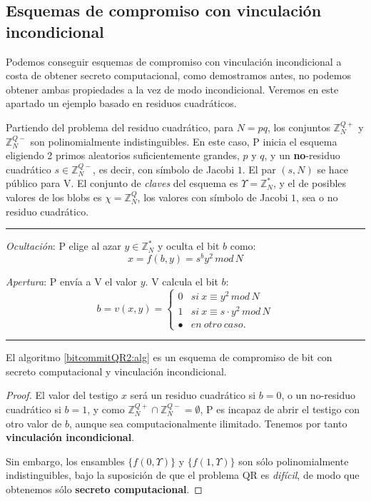 \subsection{Esquemas de compromiso con vinculación incondicional}

Podemos conseguir esquemas de compromiso con vinculación incondicional a costa de obtener secreto computacional, como demostramos antes, no podemos obtener ambas propiedades a la vez de modo incondicional. Veremos en este apartado un ejemplo basado en residuos cuadráticos.

\hfil

Partiendo del problema del residuo cuadrático, para $N=pq$, los conjuntos $\mathbb{Z}_N^{Q+}$ y $\mathbb{Z}_N^{Q-}$ son polinomialmente indistinguibles. En este caso, P inicia el esquema 
eligiendo 2 primos aleatorios suficientemente grandes, $p$ y $q$, y un \textbf{no}-residuo cuadrático $s\in \mathbb{Z}_N^{Q-}$, es decir, con símbolo de Jacobi $1$. El par $(s,N)$ se hace público para V. El conjunto de \textit{claves} del esquema es $\Upsilon = \mathbb{Z}_N^*$, y el de posibles valores de los blobs es $\chi = \mathbb{Z}_N^Q$, los valores con símbolo de Jacobi $1$, sea o no residuo cuadrático.



\hfil

\rule{\textwidth}{1pt}
\begin{algorithm}\label{commitQRbind:alg}
	\hfil
	
	\textit{Ocultación}: P elige al azar $y\in \mathbb{Z}_N^*$ y oculta el bit $b$ como:
	\[x = f(b,y) = s^b y^2 \, mod \, N \]
	
	\textit{Apertura}: P envía a V el valor $y$. V calcula el bit $b$:
	\[ b = v(x,y) = 
	\begin{cases}
	0  & si\ x\equiv y^2 \, mod \, N  \\
	1 & si\ x\equiv s\cdot y^2 \, mod \, N \\
	\bullet & en\ otro\ caso.
	\end{cases}
	\]
	\label{bitcommitQR2:alg}
\end{algorithm}
\rule{\textwidth}{1pt}

\hfil


\begin{proposition}
	El algoritmo \ref{bitcommitQR2:alg} es un esquema de compromiso de bit con secreto computacional y vinculación incondicional.
\end{proposition}

\begin{proof}
	El valor del testigo $x$ será un residuo cuadrático si $b=0$, o un no-residuo cuadrático si $b=1$, y como $ \mathbb{Z}_N^{Q+} \cap \mathbb{Z}_N^{Q-} = \emptyset $, P es incapaz de abrir el testigo con otro valor de $b$, aunque sea computacionalmente ilimitado. Tenemos por tanto \textbf{vinculación incondicional}.
	
	Sin embargo, los ensambles $\{f(0,\Upsilon)\}$ y $\{f(1,\Upsilon)\}$ son sólo polinomialmente indistinguibles, bajo la suposición de que el problema QR es \textit{difícil}, de modo que obtenemos sólo \textbf{secreto computacional}.
\end{proof}


